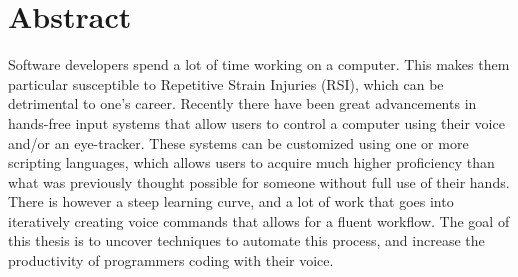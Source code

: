 \documentclass[../thesis.tex]{subfiles}
\begin{document}
\chapter*{Abstract}
Software developers spend a lot of time working on a computer.
This makes them particular susceptible to Repetitive Strain Injuries (RSI), which can be detrimental to one's career.
Recently there have been great advancements in hands-free input systems that allow users to control a computer using their voice and/or an eye-tracker.
These systems can be customized using one or more scripting languages, which allows users to acquire much higher proficiency than what was previously thought possible for someone without full use of their hands.
There is however a steep learning curve, and a lot of work that goes into iteratively creating voice commands that allows for a fluent workflow.
The goal of this thesis is to uncover techniques to automate this process, and increase the productivity of programmers coding with their voice.
\end{document}
